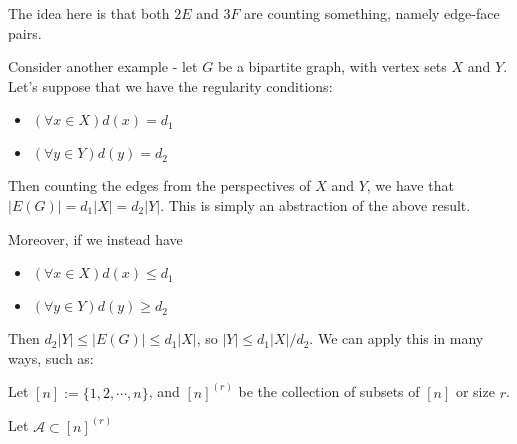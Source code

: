 \documentclass[]{article}
\theoremstyle{custhm}
\theoremstyle{definition}
\theoremstyle{custhm}
\begin{document}
The idea here is that both $2E$ and $3F$ are counting something, namely edge-face pairs.

Consider another example - let $G$ be a bipartite graph, with vertex sets $X$ and $Y$. Let's suppose that we have the regularity conditions:
\begin{itemize}
	\item $(\forall x\in X)d(x) = d_1$
	\item $(\forall y\in Y)d(y) = d_2$
\end{itemize}

Then counting the edges from the perspectives of $X$ and $Y$, we have that $|E(G)| = d_1|X| = d_2|Y|$. This is simply an abstraction of the above result.

Moreover, if we instead have
\begin{itemize}
	\item $(\forall x\in X)d(x) \le d_1$
	\item $(\forall y\in Y)d(y) \ge d_2$
\end{itemize}

Then $d_2|Y| \le |E(G)| \le d_1|X|$, so $|Y| \le d_1|X|/d_2$. We can apply this in many ways, such as:

Let $[n] := \{1,2,\cdots,n\}$, and $[n]^{(r)}$ be the collection of subsets of $[n]$ or size $r$.

Let $\mathcal{A} \subset [n]^{(r)}$
\end{document}
